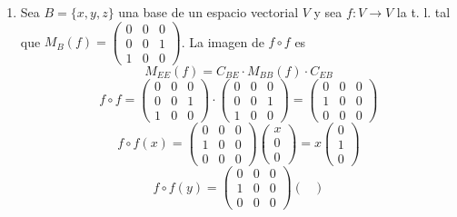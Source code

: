 \documentclass[../practica.root.tex]{subfiles}
\begin{document}
\begin{enumerate}
    \item Sea $B = \{x,y,z\}$ una base de un espacio vectorial $V$ y sea $f : V \to V$ la t. l. tal que $M_B(f) = \begin{pmatrix}
                  0 & 0 & 0 \\ 0 & 0 & 1 \\ 1 & 0 & 0
              \end{pmatrix}$. La imagen de $f \circ f$ es
          \[ M_{EE}(f) = C_{BE}\cdot M_{BB}(f)\cdot C_{EB} \]
          \[
              f \circ f = \begin{pmatrix}
                  0 & 0 & 0 \\ 0 & 0 & 1 \\ 1 & 0 & 0
              \end{pmatrix}\cdot\begin{pmatrix}
                  0 & 0 & 0 \\ 0 & 0 & 1 \\ 1 & 0 & 0
              \end{pmatrix} = \begin{pmatrix}
                  0 & 0 & 0 \\
                  1 & 0 & 0 \\
                  0 & 0 & 0
              \end{pmatrix}
          \] \[
              f \circ f(x) = \begin{pmatrix}
                  0 & 0 & 0 \\
                  1 & 0 & 0 \\
                  0 & 0 & 0
              \end{pmatrix}\begin{pmatrix}
                  x \\ 0 \\ 0
              \end{pmatrix} = x\begin{pmatrix}
                  0 \\ 1 \\ 0
              \end{pmatrix}
          \] \[
              f \circ f(y) = \begin{pmatrix}
                  0 & 0 & 0 \\
                  1 & 0 & 0 \\
                  0 & 0 & 0
              \end{pmatrix}\begin{pmatrix}

\end{pmatrix}\]
\end{enumerate}
\end{document}
